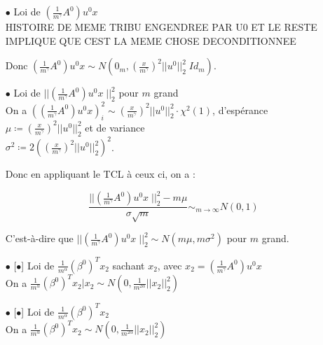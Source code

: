 \documentclass[a4paper, 11pt, french]{article}
\begin{document}
\begin{itemize}
		
		\item[$\bullet$] Loi de $ \left(\frac{1}{m^{\gamma}} A^0 \right) u^0 x $ \\
		
		HISTOIRE DE MEME TRIBU ENGENDREE PAR U0 ET LE RESTE IMPLIQUE QUE CEST LA MEME CHOSE DECONDITIONNEE
		
		Donc $ \left(\frac{1}{m^{\gamma}} A^0 \right) u^0 x  \sim  N(0_m, 
		\left( \frac{x}{m^{\gamma}} \right)^2 || u^0 ||_2^2 \; Id_m) $. \\
		
		\item[$\bullet$] Loi de $ || \left(\frac{1}{m^{\gamma}} A^0 \right) u^0 x \; ||_2^2 $ pour $m$ grand
		 \\
		
		On a $ \left( \left(\frac{1}{m^{\gamma}} A^0 \right) u^0 x \right)_i^2 \sim  
		\left( \frac{x}{m^{\gamma}} \right)^2 || u^0 ||_2^2 \cdot  \chi^2 (1) $, d'espérance 
		$ \mu \coloneqq \left( \frac{x}{m^{\gamma}} \right)^2 || u^0 ||_2^2  $  et de variance \\
		$ \sigma^2 \coloneqq 2 \left( \left( \frac{x}{m^{\gamma}} \right)^2 || u^0 ||_2^2  \right)^2 $.
		
		Donc en appliquant le TCL à ceux ci, on a :
		
		 \[
		 	\frac{|| \left(\frac{1}{m^{\gamma}} A^0 \right) u^0 x \; ||_2^2 - m \mu}{\sigma \sqrt{m}} \sim_{m \to \infty}  N(0, 1)
		 \]
		
		C'est-à-dire que $|| \left(\frac{1}{m^{\gamma}} A^0 \right) u^0 x \; ||_2^2 \sim 
		N(m \mu, m \sigma^2) $  pour $m$ grand. \\
		
		\newpage
		
		\item[$\bullet$][$\bullet$] Loi de $ \frac{1}{m^{\alpha}} (\beta^0)^T x_2 $ sachant $x_2$, avec 
		$x_2 = \left(\frac{1}{m^{\gamma}} A^0 \right) u^0 x$ \\
		
		On a 
		$ \frac{1}{m^{\alpha}} (\beta^0)^T x_2 | x_2 \sim N(0,  \frac{1}{m^{2\alpha}}||x_2||_2^2) $
		\\
		
		\item[$\bullet$][$\bullet$] Loi de $ \frac{1}{m^{\alpha}} (\beta^0)^T x_2 $ \\
		
		On a 
		$ \frac{1}{m^{\alpha}} (\beta^0)^T x_2 \sim N(0,  \frac{1}{m^{2\alpha}}||x_2||_2^2) $
		\\
		
	\end{itemize}
\end{document}

